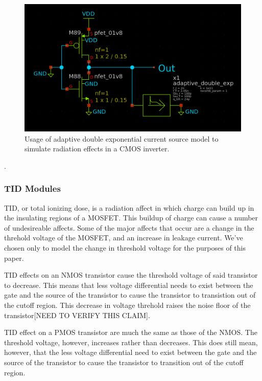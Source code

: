 \documentclass[conference]{IEEEtran}
\begin{document}
\begin{figure}[htbp]
\centering
\includegraphics[width=0.9\linewidth]{Adaptive_Current_Example_Circuit.png}
\caption{Usage of adaptive double exponential current source model to simulate radiation effects in a CMOS inverter.}
\label{fig:adaptive_model_example}
\end{figure}

\cite{Kauppila2009}.
 
\vspace{1em}
\subsubsection{TID Modules}
TID, or total ionizing dose, is a radiation affect in which charge can build up in the insulating regions of a MOSFET. This buildup of charge can cause a number of undesireable affects. Some of the major affects that occur are a change in the threhold voltage of the MOSFET, and an increase in leakage current. We've chosen only to model the change in threshold voltage for the purposes of this paper.

TID effects on an NMOS transistor cause the threshold voltage of said transistor to decrease. This means that less voltage differential needs to exist between the gate and the source of the transistor to cause the transistor to transistion out of the cutoff region. This decrease in voltage threhold raises the noise floor of the transistor[NEED TO VERIFY THIS CLAIM].

TID effect on a PMOS transistor are much the same as those of the NMOS. The threshold voltage, however, increases rather than decreases. This does still mean, however, that the less voltage differential need to exist between the gate and the source of the transistor to cause the transistor to transition out of the cutoff region.
\end{document}
